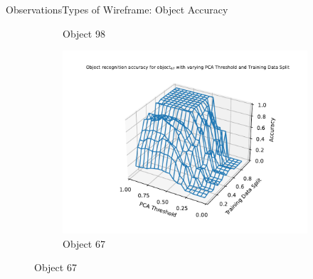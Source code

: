 \documentclass[aspectratio=169, handout, 10pt, hyperref=colorlinks]{beamer}
\begin{document}
\begin{frame}{Observations}{Types of Wireframe: Object Accuracy}
\begin{figure}
\begin{subfigure}{0.32\linewidth}
            \caption{Object 98}
        \end{subfigure}
        \begin{subfigure}{0.32\linewidth}
            \centering
            \includegraphics[width=1.2\linewidth]{wireframe/object/67.pdf}
            \caption{Object 67}
        \end{subfigure}
    \end{figure}
\end{frame}
\end{document}
